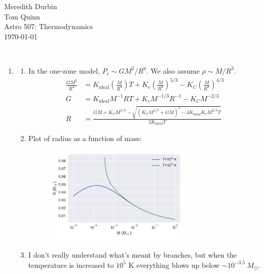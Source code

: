 \documentclass[11pt]{article}
\newcommand\density{\left( \frac{M}{R^3} \right)}
\newcommand\kideal{K_\mathrm{ideal}}
\begin{document}
\begin{flushright}Meredith Durbin\\
Tom Quinn\\
Astro 507: Thermodynamics\\
\today\\

\end{flushright}

 \\[6pt]

\begin{enumerate}

\item
	\begin{enumerate}
    \item In the one-zone model, $P_c \sim GM^2/R^4$. We also assume $\rho \sim M/R^3$.
    \begin{align}
    \frac{GM^2}{R^4} &= \kideal\density T + K_e\density^{5/3} - K_C\density^{4/3} \\
    G &= \kideal M^{-1}RT + K_e M^{-1/3} R^{-1} - K_C M^{-2/3} \\ 
    R &= \frac{GM + K_CM^{1/3} - \sqrt{ (K_C M^{1/3} + GM)^2 - 4\kideal K_e M^{2/3} T } }{2\kideal T}
    \end{align}
    
    \item Plot of radius as a function of mass:
    \begin{figure}[H]
    \centering
    \includegraphics[width=0.7\textwidth]{mass_radius.jpg}
    \end{figure}
    
    \item I don't really understand what's meant by branches, but when the temperature is increased to $10^5$ K everything blows up below $\sim\!10^{-3.5}~M_\odot$. %
    \end{enumerate}
    

\end{enumerate}
\end{document}

